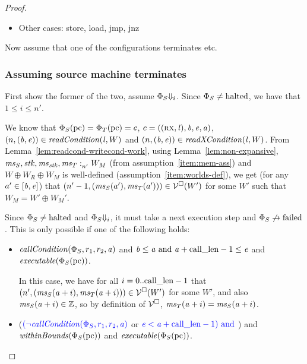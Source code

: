 \documentclass[a4paper]{article}
\begin{document}
\begin{proof}
{\begin{itemize}
\begin{itemize}
\begin{itemize}
      $k = 1$
    \item (restrict,cca,seta2b) $w_1 = \stkptr{\perm,\baddr,\eaddr,\aaddr}$, $w_2 = ((\perm,\lin),\baddr,\eaddr,\aaddr)$, $\Phi_S(r_1) = \stkptr{\perm',\baddr,\eaddr,\aaddr'}$ and $\Phi_T(r_1) = ((\perm',\lin),\baddr,\eaddr,\aaddr')$ and $\perm' \sqsubseteq\perm$,
      $k = 1$
    \item ...
      \end{itemize}
  \end{itemize}
\item Other cases: store, load, jmp, jnz
\end{itemize}

Now assume that one of the configurations terminates etc.

}

\subsubsection*{Assuming source machine terminates}
First show the former of the two, assume $\Phi_S\term[i]$.
Since $\Phi_S \neq \halted$, we have that $1 \leq i \leq n'$.

We know that $\Phi_S(\pcreg) = \Phi_T(\pcreg) = c$, $c=((\rx,\lin),\baddr,\eaddr,\aaddr)$, $\npair{(\baddr,\eaddr)}\in \readCond{\lin,W}$ and $\npair{(\baddr,\eaddr)}\in \xReadCond{\lin,W}$.
From Lemma~\ref{lem:readcond-writecond-work}, using Lemma~\ref{lem:non-expansive}, $\memSat[n']{\ms_S,\stk,\ms_\stk,\ms_T}{W_M}$ (from assumption~\ref{item:mem-ass}) and $W \oplus W_R \oplus W_M$ is well-defined (assumption~\ref{item:worlds-def}), we get (for any $a' \in [\baddr,\eaddr]$) that $\npair[n'-1]{(\ms_S(a'),\ms_T(a'))} \in \lrv(W')$ for some $W'$ such that $W_M = W' \oplus W_M'$.

Since $\Phi_S \neq \halted$ and $\Phi_S\term[i]$, it must take a next execution step and $\Phi_S \not\step\failed$. 
This is only possible if one of the following holds:
\begin{itemize}
\item $\callCond{\Phi_S,r_1,r_2,\aaddr}$ and
  $\baddr \leq \aaddr \tand \aaddr + \calllen-1 \leq \eaddr$ and 
  $\exec{\Phi_S(\pcreg)}$.

  In this case, we have for all $i = 0..\calllen-1$ that $\npair[n']{(\ms_S(\aaddr+i),\ms_T(\aaddr+i))} \in \lrv(W')$ for some $W'$, and also $\ms_S(\aaddr+i) \in \ints$, so by definition of $\lrv$, $\ms_T(\aaddr+i) = \ms_S(\aaddr+i)$.
\item ($\src{(\neg\callCond{\Phi_S,r_1,r_2,\aaddr}}$ or $\src{\eaddr < \aaddr + \calllen-1) \tand}$) and
  $\withinBounds{\Phi_S(\pcreg)}$ and $\exec{\Phi_S(\pcreg)}$.


\end{itemize}
\end{proof}
\end{document}
